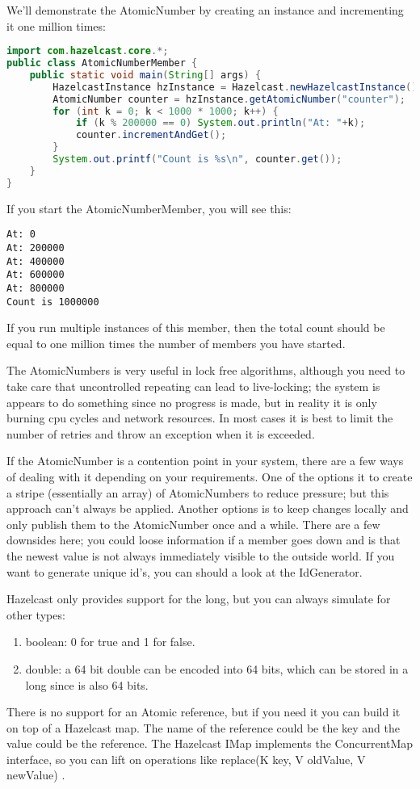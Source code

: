 We'll demonstrate the AtomicNumber by creating an instance and incrementing it one million times:
\begin{lstlisting}[language=java]
import com.hazelcast.core.*;
public class AtomicNumberMember {
    public static void main(String[] args) {
        HazelcastInstance hzInstance = Hazelcast.newHazelcastInstance();
        AtomicNumber counter = hzInstance.getAtomicNumber("counter");
        for (int k = 0; k < 1000 * 1000; k++) {
            if (k % 200000 == 0) System.out.println("At: "+k);
            counter.incrementAndGet();
        }
        System.out.printf("Count is %s\n", counter.get());
    }
}
\end{lstlisting}
If you start the AtomicNumberMember, you will see this:
\begin{lstlisting}
At: 0
At: 200000
At: 400000
At: 600000
At: 800000
Count is 1000000
\end{lstlisting}
If you run multiple instances of this member, then the total count should be equal to one million times the number of members you have started.

The AtomicNumbers is very useful in lock free algorithms, although you need to take care that uncontrolled repeating can lead to live-locking; the system is appears to do something since no progress is made, but in reality it is only burning cpu cycles and network resources. In most cases it is best to limit the number of retries and throw an exception when it is exceeded.

If the AtomicNumber is a contention point in your system, there are a few ways of dealing with it depending on your requirements. One of the options it to create a stripe (essentially an array) of AtomicNumbers to reduce pressure; but this approach can't always be applied. Another options is to keep changes locally and only publish them to the AtomicNumber once and a while. There are a few downsides here; you could loose information if a member goes down and is that the newest value is not always immediately visible to the outside world. If you want to generate unique id's, you can should a look at the IdGenerator.

Hazelcast only provides support for the long, but you can always simulate for other types:
\begin{enumerate}
\item boolean: 0 for true and 1 for false.
\item double: a 64 bit double can be encoded into 64 bits, which can be stored in a long since is also 64 bits.
\end{enumerate}
There is no support for an Atomic reference, but if you need it you can build it on top of a Hazelcast map. The name of the reference could be the key and the value could be the reference. The Hazelcast IMap implements the ConcurrentMap interface, so you can lift on operations like replace(K key, V oldValue, V newValue) . 


